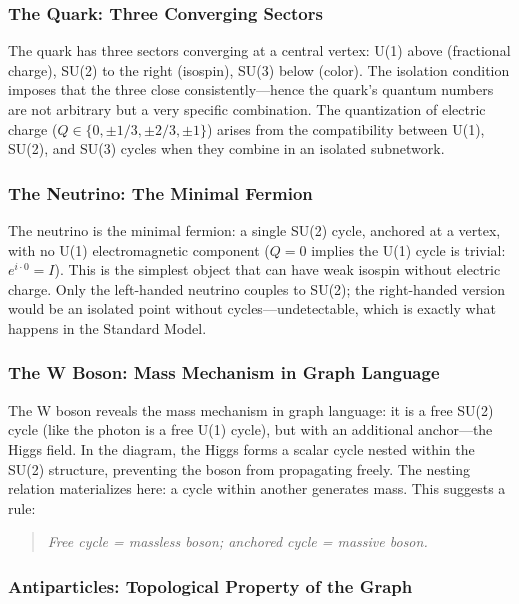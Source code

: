 \subsubsection{The Quark: Three Converging Sectors}

The quark has three sectors converging at a central vertex: U(1) above (fractional charge), SU(2) to the right (isospin), SU(3) below (color). The isolation condition imposes that the three close consistently---hence the quark's quantum numbers are not arbitrary but a very specific combination. The quantization of electric charge ($Q \in \{0, \pm 1/3, \pm 2/3, \pm 1\}$) arises from the compatibility between U(1), SU(2), and SU(3) cycles when they combine in an isolated subnetwork.

\subsubsection{The Neutrino: The Minimal Fermion}

The neutrino is the minimal fermion: a single SU(2) cycle, anchored at a vertex, with no U(1) electromagnetic component ($Q = 0$ implies the U(1) cycle is trivial: $e^{i \cdot 0} = I$). This is the simplest object that can have weak isospin without electric charge. Only the left-handed neutrino couples to SU(2); the right-handed version would be an isolated point without cycles---undetectable, which is exactly what happens in the Standard Model.

\subsubsection{The W Boson: Mass Mechanism in Graph Language}

The W boson reveals the mass mechanism in graph language: it is a free SU(2) cycle (like the photon is a free U(1) cycle), but with an additional anchor---the Higgs field. In the diagram, the Higgs forms a scalar cycle nested within the SU(2) structure, preventing the boson from propagating freely. The nesting relation materializes here: a cycle within another generates mass. This suggests a rule:

\begin{quote}
\emph{Free cycle = massless boson; anchored cycle = massive boson.}
\end{quote}

\subsubsection{Antiparticles: Topological Property of the Graph}

